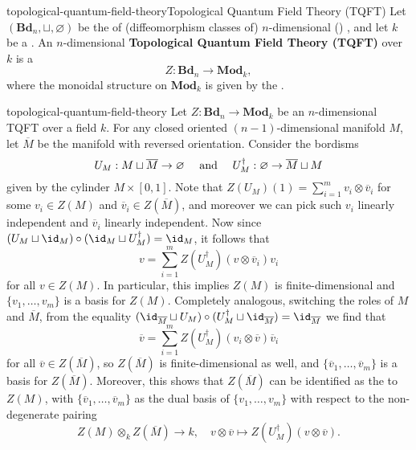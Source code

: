 \begin{topic}{topological-quantum-field-theory}{Topological Quantum Field Theory (TQFT)}
    Let $(\textbf{Bd}_n, \sqcup, \varnothing)$ be the  of (diffeomorphism classes of) $n$-dimensional () , and let $k$ be a . An $n$-dimensional \textbf{Topological Quantum Field Theory (TQFT)} over $k$ is a 
    \[ Z : \textbf{Bd}_n \to \textbf{Mod}_k , \]
    where the monoidal structure on $\textbf{Mod}_k$ is given by the .
\end{topic}


\begin{example}{topological-quantum-field-theory}
    Let $Z : \textbf{Bd}_n \to \textbf{Mod}_k$ be an $n$-dimensional TQFT over a field $k$. For any closed oriented $(n - 1)$-dimensional manifold $M$, let $\overline{M}$ be the manifold with reversed orientation. Consider the bordisms
    \[ U_M : M \sqcup \overline{M} \to \varnothing \quad \textup{ and } \quad U_M^\dag : \varnothing \to \overline{M} \sqcup M \]
    given by the cylinder $M \times [0, 1]$.
    Note that $Z(U_M)(1) = \sum_{i = 1}^{m} v_i \otimes \overline{v}_i$ for some $v_i \in Z(M)$ and $\overline{v}_i \in Z(\overline{M})$, and moreover we can pick such $v_i$ linearly independent and $\overline{v}_i$ linearly independent.
    Now since $(U_M \sqcup \id_M) \circ (\id_M \sqcup U_M^\dag) = \id_M$, it follows that
    \[ v = \sum_{i = 1}^{m} Z(U_M^\dag)(v \otimes \overline{v}_i) v_i \]
    for all $v \in Z(M)$. In particular, this implies $Z(M)$ is finite-dimensional and $\{ v_1, \ldots, v_m \}$ is a basis for $Z(M)$.
    Completely analogous, switching the roles of $M$ and $\overline{M}$, from the equality $(\id_{\overline{M}} \sqcup U_M) \circ (U_M^\dag \sqcup \id_{\overline{M}}) = \id_{\overline{M}}$ we find that
    \[ \overline{v} = \sum_{i = 1}^{m} Z(U_M^\dag)(v_i \otimes \overline{v}) \overline{v}_i \]
    for all $\overline{v} \in Z(\overline{M})$, so $Z(\overline{M})$ is finite-dimensional as well, and $\{ \overline{v}_1, \ldots, \overline{v}_m \}$ is a basis for $Z(\overline{M})$. Moreover, this shows that $Z(\overline{M})$ can be identified as the  to $Z(M)$, with $\{ \overline{v}_1, \ldots, \overline{v}_m \}$ as the dual basis of $\{ v_1, \ldots, v_m \}$ with respect to the non-degenerate pairing
    \[ Z(M) \otimes_k Z(\overline{M}) \to k, \quad v \otimes \overline{v} \mapsto Z(U_M^\dagger)(v \otimes \overline{v}) . \]
\end{example}

